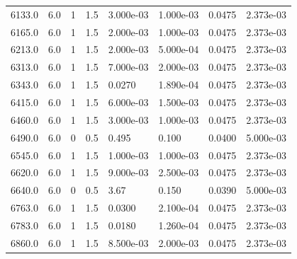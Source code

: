 \documentclass[preview]{standalone}
\begin{document}
{{{\begin{tabular}{L{1.2cm}C{1.2cm} C{0.3cm}C{0.5cm} C{1.4cm}C{1.4cm} C{1.4cm}C{1.4cm}}
  6133.0  &   6.0  & 1     & 1.5 &  3.000e-03  & 1.000e-03  & 0.0475 &  2.373e-03   \\ 
  6165.0  &   6.0  & 1     & 1.5 &  2.000e-03  & 1.000e-03  & 0.0475 &  2.373e-03   \\ 
  6213.0  &   6.0  & 1     & 1.5 &  2.000e-03  & 5.000e-04  & 0.0475 &  2.373e-03   \\ 
  6313.0  &   6.0  & 1     & 1.5 &  7.000e-03  & 2.000e-03  & 0.0475 &  2.373e-03   \\ 
  6343.0  &   6.0  & 1     & 1.5 &  0.0270  & 1.890e-04  & 0.0475 &  2.373e-03   \\ 
  6415.0  &   6.0  & 1     & 1.5 &  6.000e-03  & 1.500e-03  & 0.0475 &  2.373e-03   \\ 
  6460.0  &   6.0  & 1     & 1.5 &  3.000e-03  & 1.000e-03  & 0.0475 &  2.373e-03   \\ 
  6490.0  &   6.0  & 0     & 0.5 &  0.495  & 0.100  & 0.0400 &  5.000e-03   \\ 
  6545.0  &   6.0  & 1     & 1.5 &  1.000e-03  & 1.000e-03  & 0.0475 &  2.373e-03   \\ 
  6620.0  &   6.0  & 1     & 1.5 &  9.000e-03  & 2.500e-03  & 0.0475 &  2.373e-03   \\ 
  6640.0  &   6.0  & 0     & 0.5 &  3.67  & 0.150  & 0.0390 &  5.000e-03   \\ 
  6763.0  &   6.0  & 1     & 1.5 &  0.0300  & 2.100e-04  & 0.0475 &  2.373e-03   \\ 
  6783.0  &   6.0  & 1     & 1.5 &  0.0180  & 1.260e-04  & 0.0475 &  2.373e-03   \\ 
  6860.0  &   6.0  & 1     & 1.5 &  8.500e-03  & 2.000e-03  & 0.0475 &  2.373e-03   \\ 
\hline 
\end{tabular} 

}}}
\end{document}
